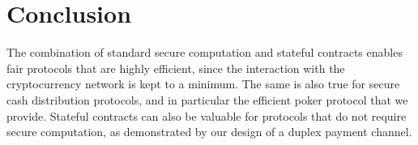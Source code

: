 \section{Conclusion}

The combination of standard secure computation and stateful contracts enables fair protocols that are highly
efficient, since the interaction with the cryptocurrency network is kept to a minimum. The same is also true
for secure cash distribution protocols, and in particular the efficient poker protocol that we provide. Stateful
contracts can also be valuable for protocols that do not require secure computation, as demonstrated by our
design of a duplex payment channel.